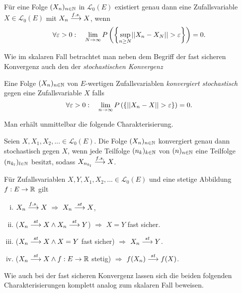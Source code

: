 \begin{theorem}
    Für eine Folge $(X_n)_{n \in \mathbb{N}}$ in $\mathcal{L}_0(E)$ existiert genau dann eine Zufallsvariable $X \in \mathcal{L}_0(E)$ mit $X_n \overset{f.s.}{\longrightarrow} X$, wenn
    $$
        \forall \varepsilon > 0 : \quad \lim_{N \to \infty}P\left(\left\{ \sup_{n\geq N}\lvert\lvert X_n - X_N \rvert\rvert > \varepsilon \right\}\right) = 0. 
    $$
\end{theorem}

Wie im skalaren Fall betrachtet man neben dem Begriff der fast sicheren Konvergenz auch den der \textit{stochastischen Konvergenz}

\begin{mydef}
    Eine Folge $(X_n)_{n \in \mathbb{N}}$ von $E$-wertigen Zufallsvariablen \textit{konvergiert stochastisch} gegen eine Zufallsvariable $X$ falls
    $$
        \forall \varepsilon > 0: \quad \lim_{n \to \infty}P\left(\left\{ \lvert\lvert X_n - X  \rvert\rvert > \varepsilon \right\}\right) = 0. 
    $$      
\end{mydef}

Man erhält unmittelbar die folgende Charakterisierung. 

\begin{theorem}[Teilfolgenkriterium]
    Seien $X,X_1,X_2,... \in \mathcal{L}_0(E)$. Die Folge $(X_n)_{n \in \mathbb{N}}$ konvergiert genau dann stochastisch gegen $X$, 
    wenn jede Teilfolge $(n_k)_{k \in \mathbb{N}}$ von $(n)_{n \in \mathbb{N}}$ eine Teilfolge $(n_{k_l})_{l \in \mathbb{N}}$ besitzt, sodass $X_{n_{k_l}} \overset{f.s.}{\longrightarrow} X$.  
\end{theorem}

\begin{corollary}
    Für Zufallsvariablen $X,Y, X_1, X_2,... \in \mathcal{L}_0(E)$ und eine stetige Abbildung $f:E \to \mathbb{R}$ gilt
    \begin{enumerate}[(i)]
        \item $X_n \overset{f.s.}{\longrightarrow} X \ \Rightarrow \ X_n \overset{st}{\longrightarrow} X$,
        \item ($X_n \overset{st}{\longrightarrow} X \land X_n \overset{st}{\longrightarrow} Y$) $\Rightarrow$ $ X = Y$ fast sicher. 
        \item ($X_n \overset{st}{\longrightarrow} X \land X = Y$ fast sicher) $\Rightarrow$ $X_n \overset{st}{\longrightarrow} Y$. 
        \item ($X_n \overset{st}{\longrightarrow} X \land f:E \to \mathbb{R}$ stetig) $\Rightarrow$ $f(X_n) \overset{st}{\longrightarrow} f(X)$. 
    \end{enumerate}
\end{corollary}

Wie auch bei der fast sicheren Konvergenz lassen sich die beiden folgenden Charakterisierungen komplett analog zum skalaren Fall beweisen. 

